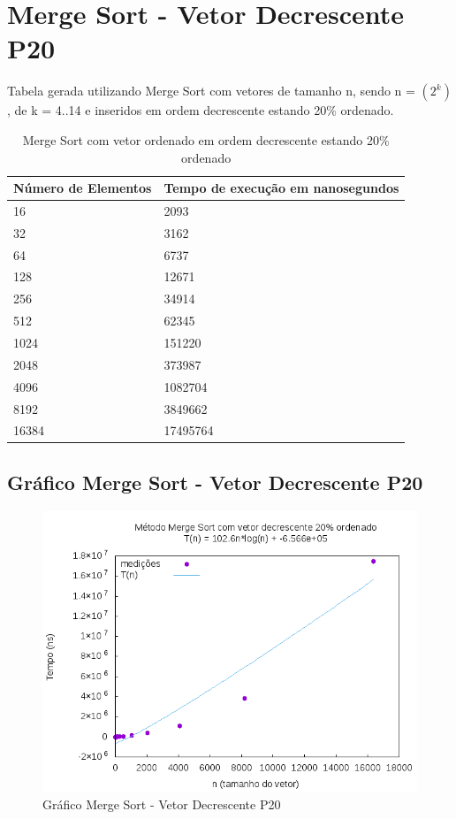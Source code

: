 \documentclass[12pt,a4paper,twoside]{report}
\begin{document}
\section{Merge Sort - Vetor Decrescente P20}
Tabela gerada utilizando Merge Sort com vetores de tamanho n, sendo n = $(2^k)$, de k = 4..14 e inseridos em ordem decrescente estando 20\% ordenado.
\begin{table}[H]
\centering
\caption{Merge Sort com vetor ordenado em ordem decrescente estando 20\% ordenado}
\label{my-label}
\begin{tabular}{|l|l|}
\hline
\multicolumn{1}{|c|}{\textbf{Número de Elementos}} & \multicolumn{1}{c|}{\textbf{Tempo de execução em nanosegundos}} \\ \hline
16 & 2093 \\ \hline
32 & 3162 \\ \hline
64 & 6737 \\ \hline
128 & 12671 \\ \hline
256 & 34914 \\ \hline
512 & 62345 \\ \hline
1024 & 151220 \\ \hline
2048 & 373987 \\ \hline
4096 & 1082704 \\ \hline
8192 & 3849662 \\ \hline
16384 & 17495764 \\ \hline
\end{tabular}
\end{table}

\subsection{Gráfico Merge Sort - Vetor Decrescente P20}
\begin{figure}[H]
    \centering
    \includegraphics[width=0.7\linewidth]{graficos/MergeSort/vIntDecrescenteP20/vIntDecrescenteP20.png}
  \caption{Gráfico Merge Sort - Vetor Decrescente P20}
\end{figure}
\end{document}
